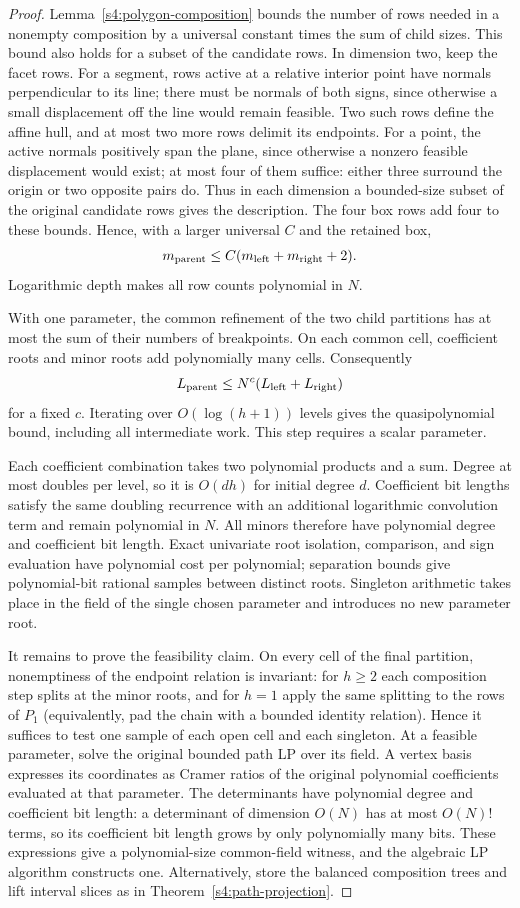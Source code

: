 \begin{proof}
Lemma~\ref{s4:polygon-composition} bounds the number of rows needed
in a nonempty composition by a universal constant times the sum of
child sizes. This bound also holds for a subset of the candidate rows.
In dimension two, keep the facet rows. For a segment, rows active at a
relative interior point have normals perpendicular to its line; there
must be normals of both signs, since otherwise a small displacement
off the line would remain feasible. Two such rows define the affine
hull, and at most two more rows delimit its endpoints. For a point,
the active normals positively span the plane, since otherwise a nonzero
feasible displacement would exist; at most four of them suffice:
either three surround the origin or two opposite pairs do. Thus in each
dimension a bounded-size subset of the original candidate rows gives the
description. The four box rows add four to these bounds.
Hence, with a larger universal $C$ and the retained box,
\[
 m_{\rm parent}\le C(m_{\rm left}+m_{\rm right}+2).
\]
Logarithmic depth makes all row counts polynomial in $N$.

With one parameter, the common refinement of the two child partitions has
at most the sum of their numbers of breakpoints. On each common cell,
coefficient roots and minor roots add polynomially many
cells. Consequently
\[
 L_{\rm parent}\le N^c(L_{\rm left}+L_{\rm right})
\]
for a fixed $c$. Iterating over $O(\log(h+1))$ levels gives the
quasipolynomial bound, including all intermediate work. This step
requires a scalar parameter.

Each coefficient combination takes two polynomial products and a sum.
Degree at most doubles per level, so it is $O(dh)$ for initial degree
$d$. Coefficient bit lengths satisfy the same doubling recurrence with an
additional logarithmic convolution term and remain polynomial in $N$.
All minors therefore have polynomial degree and coefficient bit length. Exact univariate
root isolation, comparison, and sign evaluation have polynomial cost
per polynomial; separation bounds give polynomial-bit rational samples
between distinct roots. Singleton arithmetic takes place in the field
of the single chosen parameter and introduces no new parameter root.

It remains to prove the feasibility claim. On every cell of the final
partition, nonemptiness of the endpoint relation is invariant: for
$h\ge2$ each composition step splits at the minor roots, and for $h=1$
apply the same splitting to the rows of $P_1$ (equivalently, pad the
chain with a bounded identity relation). Hence it suffices to test one
sample of each open cell and each singleton. At a feasible
parameter, solve the original bounded path LP over its field. A vertex
basis expresses its coordinates as Cramer ratios of the original
polynomial coefficients evaluated at that parameter. The determinants
have polynomial degree and coefficient bit length: a determinant of dimension $O(N)$
has at most $O(N)!$ terms, so its coefficient bit length grows by
only polynomially many bits. These expressions give a polynomial-size
common-field witness, and the algebraic LP algorithm constructs one.
Alternatively, store the balanced composition trees and lift interval
slices as in Theorem~\ref{s4:path-projection}.
\end{proof}

